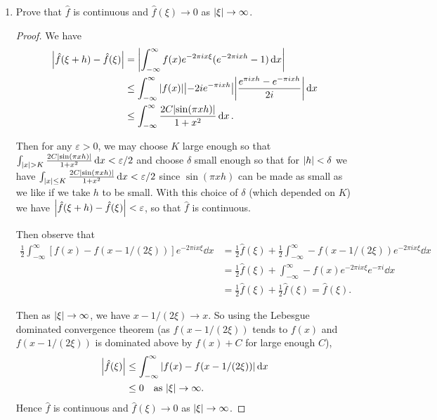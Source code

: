 \documentclass[11pt]{article}
\begin{document}
\begin{enumerate}[label=(\alph*)]
  \item Prove that $\hat{f}$ is continuous and $\hat{f}(\xi) \to 0$ as $\abs{\xi}\to \infty$.
  \begin{proof}
    We have \begin{align*}
      \abs{\hat{f}(\xi+h) - \hat{f}(\xi)} &= \abs{\int_{-\infty}^{\infty} f(x)e^{-2\pi i x \xi}(e^{-2\pi i x h} - 1)\dd{x}}\\
      &\leq \int_{-\infty}^{\infty} \abs{f(x)}\abs{-2ie^{-\pi i x h}}\abs{\frac{e^{\pi i x h} - e^{-\pi i x h}}{2i}}\dd{x}\\
      &\leq \int_{-\infty}^{\infty} \frac{2C\abs{\sin(\pi x h)}}{1+x^2}\dd{x}.
    \end{align*}

    Then for any $\varepsilon >0$, we may choose $K$ large enough so that $\int_{\abs{x}> K}\frac{2C\abs{\sin(\pi x h)}}{1+x^2}\dd{x} < \varepsilon /2 $ and choose $\delta$ small enough so that for $\abs{h} < \delta$ we have $\int_{\abs{x} \leq K}\frac{2C\abs{\sin(\pi x h)}}{1+x^2}\dd{x} < \varepsilon /2 $ since $\sin(\pi x h)$ can be made as small as we like if we take $h$ to be small. With this choice of $\delta$ (which depended on $K$) we have $\abs{\hat{f}(\xi+h) - \hat{f}(\xi)} < \varepsilon$, so that $\hat{f}$ is continuous.

    Then observe that
    \begin{align*}
      \frac{1}{2}\int_{-\infty}^{\infty} [f(x)-f(x-1/(2\xi))]e^{-2\pi i x \xi}\dd{x} &= \frac{1}{2}\hat{f}(\xi) + \frac{1}{2} \int_{-\infty}^{\infty}-f(x-1/(2\xi))e^{-2\pi i x \xi}\dd{x}\\
      &= \frac{1}{2}\hat{f}(\xi) + \int_{-\infty}^{\infty} -f(x)e^{-2\pi i x \xi}e^{-\pi i}\dd{x} \\
      &= \frac{1}{2}\hat{f}(\xi) +\frac{1}{2}\hat{f}(\xi) = \hat{f}(\xi) .
    \end{align*}

    Then as $\abs{\xi}\to \infty$, we have $x-1/(2\xi) \to x$. So using the Lebesgue dominated convergence theorem (as $f(x-1/(2\xi))$ tends to $f(x)$ and $f(x-1/(2\xi))$ is dominated above by $f(x)+C$ for large enough $C$), \begin{align*}
      \abs{\hat{f}(\xi)} &\leq \int_{-\infty}^{\infty} \abs{f(x)-f(x-1/(2\xi))}\dd{x}\\
      &\leq 0 \quad \text{as } \abs{\xi}\to \infty.
    \end{align*}
    Hence $\hat{f}$ is continuous and $\hat{f}(\xi) \to 0$ as $\abs{\xi}\to \infty$.
  \end{proof}
\end{enumerate}
\end{document}
